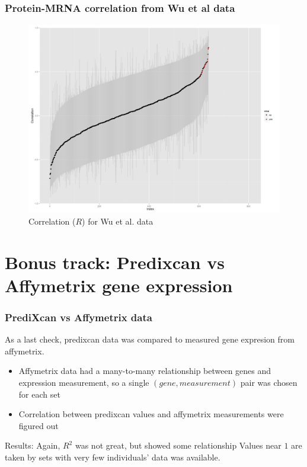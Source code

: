 \documentclass{beamer}
\begin{document}
  \begin{frame}
    \frametitle{Protein-MRNA correlation from Wu et al data}
    \begin{center}
      \begin{figure}
      \includegraphics[scale=0.2]{../Out/wu_mrna_protein.png}
      \caption{Correlation ($R$) for Wu et al. data}
      \end{figure}
    \end{center}
  \end{frame}

  \section{Bonus track: Predixcan vs Affymetrix gene expression}
  \begin{frame}
    \frametitle{PrediXcan vs Affymetrix data}
    As a last check, predixcan data was compared to measured gene expresion from affymetrix.
    \begin{itemize}
      \item
      Affymetrix data had a many-to-many relationship between genes and expression measurement, so a single $(gene,measurement)$ pair was chosen for each set
      \item
      Correlation between predixcan values and affymetrix measurements were figured out
    \end{itemize}
    \vskip15pt
    Results:
    Again, $R^2$ was not great, but showed some relationship
    Values near $1$ are taken by sets with very few individuals' data was available.
  \end{frame}
  
\end{document}
